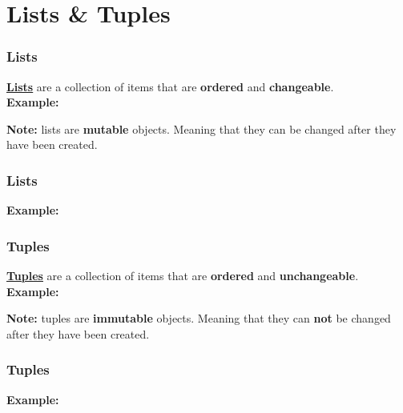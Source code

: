 \documentclass{beamer}
\newcommand{\hrefu}[2]{\underline{\href{#1}{#2}}}
\begin{document}
\section{Lists \& Tuples}
\begin{frame}
\frametitle{Lists}
  \textbf{\hrefu{https://docs.python.org/3/tutorial/datastructures.html\#more-on-lists}{Lists}} are a collection of items that are \textbf{ordered} and \textbf{changeable}.\\
  \vspace{5mm}
  \textbf{Example:}
  
  \vspace{5mm}
  \textbf{Note:} lists are \textbf{mutable} objects. Meaning that they can be changed after they have been created.
\end{frame}
\begin{frame}
\frametitle{Lists}
  \textbf{Example:}
  
\end{frame}
\begin{frame}
  \frametitle{Tuples}
  \textbf{\hrefu{https://docs.python.org/3/tutorial/datastructures.html\#tuples-and-sequences}{Tuples}} are a collection of items that are \textbf{ordered} and \textbf{unchangeable}.\\
  \vspace{5mm}
  \textbf{Example:}
  
  \vspace{5mm}
  \textbf{Note:} tuples are \textbf{immutable} objects. Meaning that they can \textbf{not} be changed after they have been created.
\end{frame}
\begin{frame}
  \frametitle{Tuples}
  \textbf{Example:}
  
\end{frame}
\end{document}
